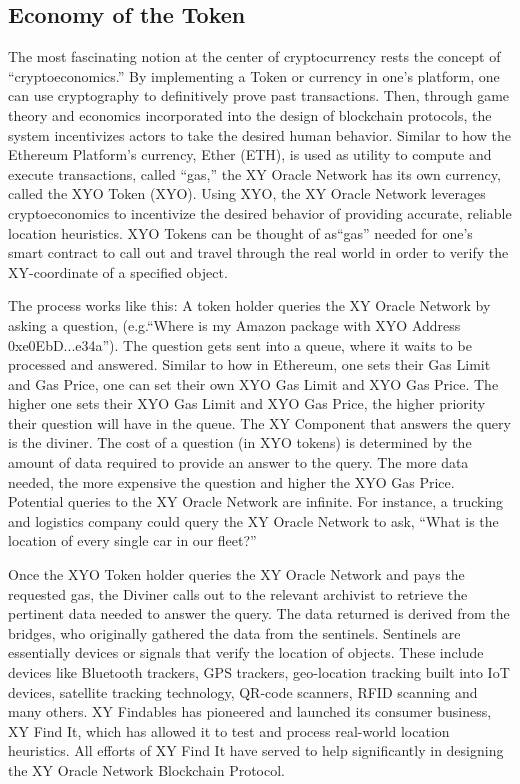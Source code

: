 \documentclass{article}
\begin{document}
\subsection {Economy of the Token}
The most fascinating notion at the center of cryptocurrency rests the concept of ``\gls{cryptoeconomics}.'' By implementing a Token or currency in one's platform, one can use cryptography to definitively prove past transactions. Then, through game theory and economics incorporated into the design of blockchain protocols, the system incentivizes actors to take the desired human behavior. Similar to how the Ethereum Platform's currency, Ether (ETH), is used as utility to compute and execute transactions, called ``\gls{gas},'' the XY Oracle Network has its own currency, called the XYO Token (XYO). Using XYO, the XY Oracle Network leverages cryptoeconomics to incentivize the desired behavior of providing accurate, reliable location \glspl{heuristic}. XYO Tokens can be thought of as``gas'' needed for one's smart contract to call out and travel through the real world in order to verify the XY-coordinate of a specified object.

The process works like this: A token holder queries the XY Oracle Network by asking a question, (e.g.``Where is my Amazon package with XYO Address 0xe0EbD...e34a''). The question gets sent into a queue, where it waits to be processed and answered. Similar to how in Ethereum, one sets their Gas Limit and Gas Price, one can set their own XYO Gas Limit and XYO Gas Price. The higher one sets their XYO Gas Limit and XYO Gas Price, the higher priority their question will have in the queue. The XY Component that answers the query is the \Gls{diviner}. The cost of a question (in XYO tokens) is determined by the amount of data required to provide an answer to the query.  The more data needed, the more expensive the question and higher the XYO Gas Price. Potential queries to the XY Oracle Network are infinite. For instance, a trucking and logistics company could query the XY Oracle Network to ask, ``What is the location of every single car in our fleet?''

Once the XYO Token holder queries the XY Oracle Network and pays the requested gas, the Diviner calls out to the relevant \Gls{archivist} to retrieve the pertinent data needed to answer the query. The data returned is derived from the \Glspl{bridge}, who originally gathered the data from the \Glspl{sentinel}. Sentinels are essentially devices or signals that verify the location of objects. These include devices like Bluetooth trackers, GPS trackers, geo-location tracking built into IoT devices, satellite tracking technology, QR-code scanners, RFID scanning and many others. XY Findables has pioneered and launched its consumer business, XY Find It, which has allowed it to test and process real-world location heuristics. All efforts of XY Find It have served to help significantly in designing the XY Oracle Network Blockchain Protocol.
\end{document}
